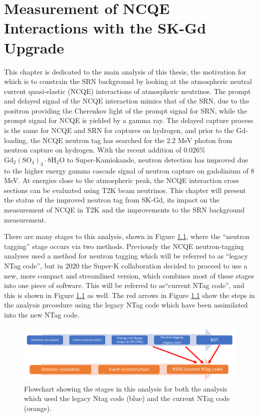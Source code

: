 \chapter{Measurement of NCQE
Interactions with the SK-Gd Upgrade}
\label{chp:ncqegd}

This chapter is dedicated to the main analysis of this thesis, the motivation for which is to constrain the SRN background by looking at the atmospheric neutral current quasi-elastic (NCQE) interactions of atmospheric neutrinos. The prompt and delayed signal of the NCQE interaction mimics that of the SRN, due to the positron providing the Cherenkov light of the prompt signal for SRN, while the prompt signal for NCQE is yielded by a gamma ray. The delayed capture process is the same for NCQE and SRN for captures on hydrogen, and prior to the Gd-loading, the NCQE neutron tag has searched for the 2.2 MeV photon from neutron capture on hydrogen. With the recent addition of 0.026\% $\mathrm{Gd}_{2}\left(\mathrm{SO}_{4}\right)_{3} \cdot 8 \mathrm{H}_{2} \mathrm{O}$ to Super-Kamiokande, neutron detection has improved due to the higher energy gamma cascade signal of neutron capture on gadolinium of 8 MeV. At energies close to the atmospheric peak, the NCQE interaction cross sections can be evaluated using T2K beam neutrinos. This chapter will present the status of the improved neutron tag from SK-Gd, its impact on the measurement of NCQE in T2K and the improvements to the SRN background measurement.

There are many stages to this analysis, shown in Figure \ref{fig:analysis_flowchart}, where the ``neutron tagging'' stage occurs via two methods. Previously the NCQE neutron-tagging analyses used a method for neutron tagging which will be referred to as ``legacy NTag code'', but in 2020 the Super-K collaboration decided to proceed to use a new, more compact and streamlined version, which combines most of these stages into one piece of software. This will be referred to as``current NTag code'', and this is shown in Figure \ref{fig:analysis_flowchart} as well. The red arrows in Figure \ref{fig:analysis_flowchart} show the steps in the analysis prcoedure using the legacy NTag code which have been assimilated into the new NTag code.

\begin{figure}
    \includegraphics[width=\textwidth]{Figures/analysis_flowchart.png}
    \caption{Flowchart showing the stages in this analysis for both the analysis which used the legacy Ntag code (blue) and the current NTag code (orange).}
\label{fig:analysis_flowchart}
\end{figure}

